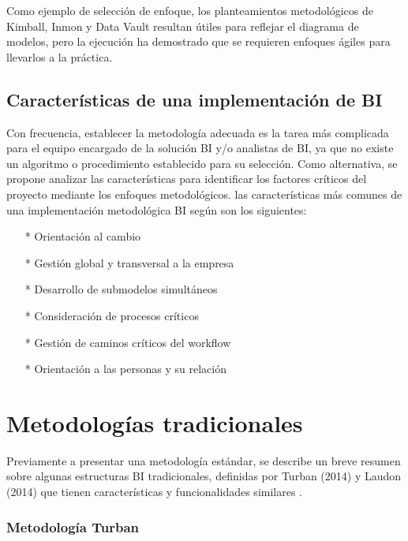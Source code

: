 \documentclass[11pt,titlepage]{report}
\begin{document}
Como ejemplo de selección de enfoque, los planteamientos metodológicos de Kimball, Inmon y Data Vault resultan útiles para reflejar el diagrama de modelos, pero la ejecución ha demostrado que se requieren enfoques ágiles para llevarlos a la práctica.


\subsection{Características de una implementación de BI}

Con frecuencia, establecer la metodología adecuada es la tarea más complicada para el equipo encargado de la solución BI y/o analistas de BI, ya que no existe un algoritmo o procedimiento establecido para su selección. Como alternativa, se propone analizar las características para identificar los factores críticos del proyecto mediante los enfoques metodológicos. las características más comunes de una implementación metodológica BI según \cite{web06} son los siguientes:
\begin{multicols}{2}
\begin{itemize}
\item[*] Orientación al cambio
\item[*] Gestión global y transversal a la empresa
\item[*] Desarrollo de submodelos simultáneos
\item[*] Consideración de procesos críticos
\item[*] Gestión de caminos críticos del workflow
\item[*] Orientación a las personas y su relación
\end{itemize}
\end{multicols}


\section{Metodologías tradicionales}

Previamente a presentar una metodología estándar, se describe un breve resumen sobre algunas estructuras BI tradicionales, definidas por Turban (2014) y Laudon (2014) que tienen características y funcionalidades similares \cite{lib02}.

\subsubsection{Metodología Turban}
\end{document}
